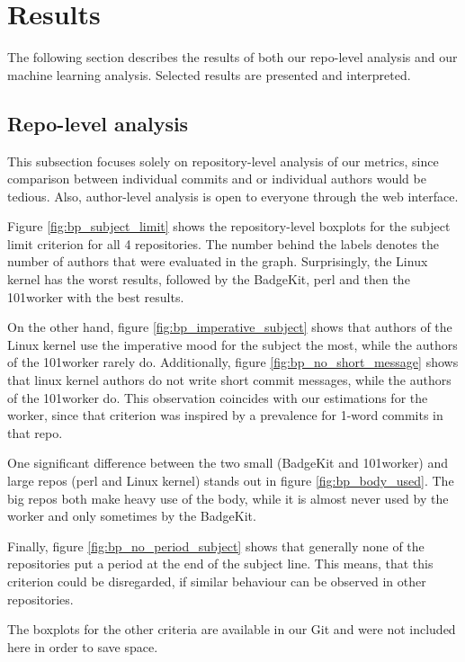 \section{Results}
\label{sec:results}

The following section describes the results of both our repo-level analysis and our machine learning analysis. Selected results are presented and interpreted.


\subsection{Repo-level analysis}
\label{sec:results1}

This subsection focuses solely on repository-level analysis of our metrics, since comparison between individual commits and or individual authors would be tedious. Also, author-level analysis is open to everyone through the web interface.

Figure \ref{fig:bp_subject_limit} shows the repository-level boxplots for the subject limit criterion for all 4 repositories. The number behind the labels denotes the number of authors that were evaluated in the graph. Surprisingly, the Linux kernel has the worst results, followed by the BadgeKit, perl and then the 101worker with the best results.

On the other hand, figure \ref{fig:bp_imperative_subject} shows that authors of the Linux kernel use the imperative mood for the subject the most, while the authors of the 101worker rarely do. Additionally, figure \ref{fig:bp_no_short_message} shows that linux kernel authors do not write short commit messages, while the authors of the 101worker do. This observation coincides with our estimations for the worker, since that criterion was inspired by a prevalence for 1-word commits in that repo.

One significant difference between the two small (BadgeKit and 101worker) and large repos (perl and Linux kernel) stands out in figure \ref{fig:bp_body_used}. The big repos both make heavy use of the body, while it is almost never used by the worker and only sometimes by the BadgeKit.

Finally, figure \ref{fig:bp_no_period_subject} shows that generally none of the repositories put a period at the end of the subject line. This means, that this criterion could be disregarded, if similar behaviour can be observed in other repositories.

The boxplots for the other criteria are available in our Git and were not included here in order to save space.

